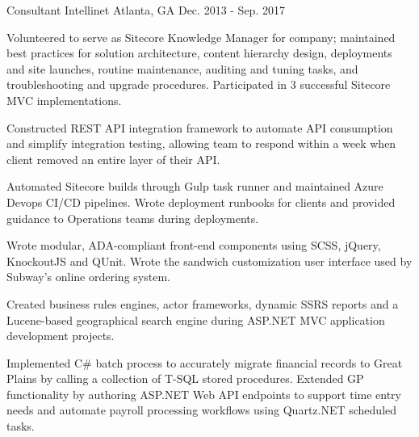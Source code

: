 \begin{cventries}
  \cventry
    {Consultant} %
    {Intellinet} %
    {Atlanta, GA} %
    {Dec. 2013 - Sep. 2017} %
    {
      \begin{cvitems} %
      	\item {Volunteered to serve as Sitecore Knowledge Manager for company; maintained best practices for solution architecture, content hierarchy design, deployments and site launches, routine maintenance, auditing and tuning tasks, and troubleshooting and upgrade procedures. Participated in 3 successful Sitecore MVC implementations.}
        \item {Constructed REST API integration framework to automate API consumption and simplify integration testing, allowing team to respond within a week when client removed an entire layer of their API.}
        \item {Automated Sitecore builds through Gulp task runner and maintained Azure Devops CI/CD pipelines. Wrote deployment runbooks for clients and provided guidance to Operations teams during deployments.}
        \item {Wrote modular, ADA-compliant front-end components using SCSS, jQuery, KnockoutJS and QUnit. Wrote the sandwich customization user interface used by Subway's online ordering system.}
        \item {Created business rules engines, actor frameworks, dynamic SSRS reports and a Lucene-based geographical search engine during ASP.NET MVC application development projects.}
        \item {Implemented C\# batch process to accurately migrate financial records to Great Plains by calling a collection of T-SQL stored procedures. Extended GP functionality by authoring ASP.NET Web API endpoints to support time entry needs and automate payroll processing workflows using Quartz.NET scheduled tasks.}
      \end{cvitems}
    }




\end{cventries}
